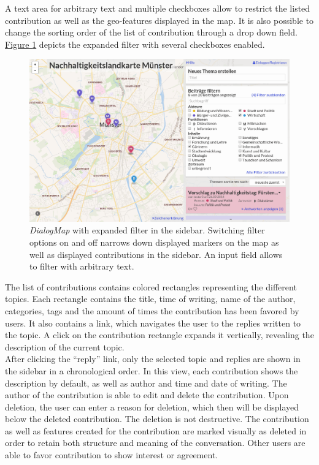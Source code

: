 A text area for arbitrary text and multiple checkboxes allow to restrict the listed contribution as well as the geo-features displayed in the map. It is also possible to change the sorting order of the list of contribution through a drop down field. \hyperref[fig:screenshot_filter]{Figure \ref{fig:screenshot_filter}} depicts the expanded filter with several checkboxes enabled.

\begin{figure}[!h]
    \centering
    \includegraphics[width=1\columnwidth]{images/screenshot_filters}
    \caption{\textit{DialogMap} with expanded filter in the sidebar. Switching filter options on and off narrows down displayed markers on the map as well as displayed contributions in the sidebar. An input field allows to filter with arbitrary text.}
    \label{fig:screenshot_filter}
\end{figure}

The list of contributions contains colored rectangles representing the different topics. Each rectangle contains the title, time of writing, name of the author, categories, tags and the amount of times the contribution has been favored by users. It also contains a link, which navigates the user to the replies written to the topic. A click on the contribution rectangle expands it vertically, revealing the description of the current topic.\\
After clicking the ``reply'' link, only the selected topic and replies are shown in the sidebar in a chronological order. In this view, each contribution shows the description by default, as well as author and time and date of writing. The author of the contribution is able to edit and delete the contribution. Upon deletion, the user can enter a reason for deletion, which then will be displayed below the deleted contribution. The deletion is not destructive. The contribution as well as features created for the contribution are marked visually as deleted in order to retain both structure and meaning of the conversation. Other users are able to favor contribution to show interest or agreement.

